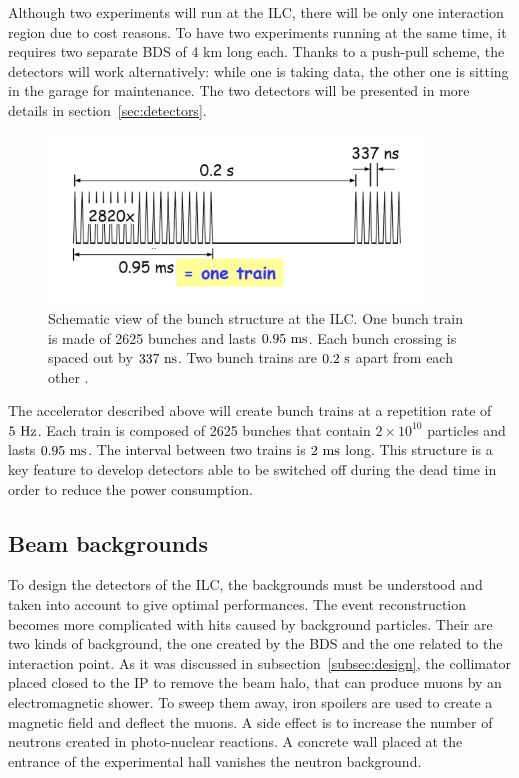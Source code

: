     Although two experiments will run at the \gls{ILC}, there will be only one interaction region due to cost reasons.
    To have two experiments running at the same time, it requires two separate \gls{BDS} of 4 km long each.
    Thanks to a push-pull scheme, the detectors will work alternatively: while one is taking data, the other one is sitting in the garage for maintenance.
    The two detectors will be presented in more details in section~\ref{sec:detectors}.
    
    \begin{figure}[!h]
      \centering
      \includegraphics[width = 10cm]{Pictures/ILC/bunch.png}
      \caption{Schematic view of the bunch structure at the ILC. One bunch train is made of 2625 bunches and lasts $0.95~\rm{ms}$. Each bunch crossing is spaced out by $337~\rm{ns}$. Two bunch trains are $0.2~\rm{s}$ apart from each other \cite{Li2010}.}
      \label{fig:bunches}
    \end{figure}

    The accelerator described above will create bunch trains at a repetition rate of $5~\rm{Hz}$. 
    Each train is composed of 2625 bunches that contain $2\times 10^{10}$ particles and lasts $0.95~\rm{ms}$. 
    The interval between two trains is $2~\rm{ms}$ long. 
    This structure is a key feature to develop detectors able to be switched off during the dead time in order to reduce the power consumption.

    \subsection{Beam backgrounds}

    To design the detectors of the \gls{ILC}, the backgrounds must be understood and taken into account to give optimal performances.
    The event reconstruction becomes more complicated with hits caused by background particles.
    Their are two kinds of background, the one created by the \gls{BDS} and the one related to the interaction point.
    As it was discussed in subsection~\ref{subsec:design}, the collimator placed closed to the \gls{IP} to remove the beam halo, that can produce muons by an electromagnetic shower.
    To sweep them away, iron spoilers are used to create a magnetic field and deflect the muons.
    A side effect is to increase the number of neutrons created in photo-nuclear reactions.
    A concrete wall placed at the entrance of the experimental hall vanishes the neutron background.

